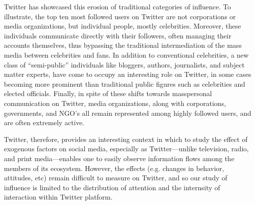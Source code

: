 \documentclass[phd,tocprelim]{cornell}
\begin{document}
Twitter has showcased this erosion of traditional categories of influence.
To illustrate, the top ten most followed users on Twitter are not
corporations or media organizations, but individual people, mostly
celebrities. Moreover, these individuals communicate directly with their
followers, often managing their accounts themselves, thus bypassing the
traditional intermediation of the mass media between celebrities and fans.
In addition to conventional celebrities, a new class of ``semi-public''
individuals like bloggers, authors, journalists, and subject matter
experts, have come to occupy an interesting role on Twitter, in some cases
becoming more prominent than traditional public figures such as celebrities
and elected officials.  Finally, in spite of these shifts towards
masspersonal communication on Twitter, media organizations, along with
corporations, governments, and NGO's all remain represented among highly
followed users, and are often extremely active.

Twitter, therefore, provides an interesting context in which to study the effect of exogenous factors on social media, especially as Twitter---unlike television, radio, and print media---enables one to easily observe information flows among the members of its ecosystem.  However, the effects (e.g. changes in behavior, attitudes, etc) remain difficult to measure on Twitter, and so our study of influence is limited to the distribution of attention and the internsity of interaction within Twitter platform.



\end{document}
